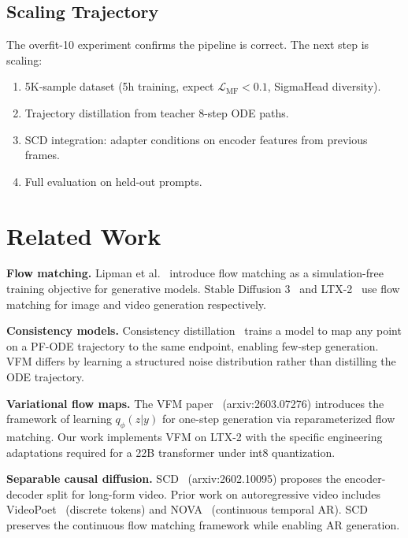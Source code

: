 \documentclass[10pt,twocolumn]{article}
\begin{document}
\subsection{Scaling Trajectory}

The overfit-10 experiment confirms the pipeline is correct. The next step is scaling:
\begin{enumerate}[nosep]
  \item 5K-sample dataset (5h training, expect $\mathcal{L}_{\text{MF}} < 0.1$, SigmaHead diversity).
  \item Trajectory distillation from teacher 8-step ODE paths.
  \item SCD integration: adapter conditions on encoder features from previous frames.
  \item Full evaluation on held-out prompts.
\end{enumerate}

\section{Related Work}
\label{sec:related}

\textbf{Flow matching.}
Lipman et al.~\cite{lipman2022flow} introduce flow matching as a simulation-free training objective for generative models. Stable Diffusion 3~\cite{sd3} and LTX-2~\cite{ltx2} use flow matching for image and video generation respectively.

\textbf{Consistency models.}
Consistency distillation~\cite{song2023consistency} trains a model to map any point on a PF-ODE trajectory to the same endpoint, enabling few-step generation. VFM differs by learning a structured noise distribution rather than distilling the ODE trajectory.

\textbf{Variational flow maps.}
The VFM paper~\cite{vfm} (arxiv:2603.07276) introduces the framework of learning $q_\phi(z|y)$ for one-step generation via reparameterized flow matching. Our work implements VFM on LTX-2 with the specific engineering adaptations required for a 22B transformer under int8 quantization.

\textbf{Separable causal diffusion.}
SCD~\cite{scd} (arxiv:2602.10095) proposes the encoder-decoder split for long-form video. Prior work on autoregressive video includes VideoPoet~\cite{videopoet} (discrete tokens) and NOVA~\cite{nova} (continuous temporal AR). SCD preserves the continuous flow matching framework while enabling AR generation.
\end{document}
